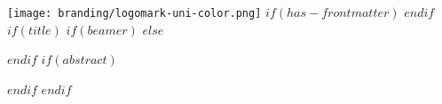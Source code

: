 \centering
\texttt{[image: branding/logomark-uni-color.png]}
$if(has-frontmatter)$
\frontmatter
$endif$
$if(title)$
$if(beamer)$
\frame{\titlepage}
$else$
{\let\newpage\relax\maketitle}
$endif$
$if(abstract)$
\begin{abstract}
$abstract$
\end{abstract}
$endif$
$endif$